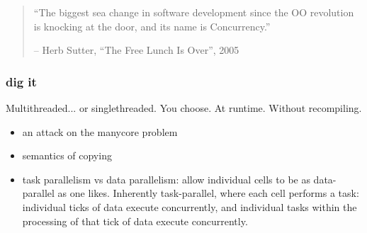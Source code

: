 \begin{frame}
\begin{quotation}
``The biggest sea change in software development since the OO
revolution is knocking at the door, and its name is Concurrency.''

\vskip0.5cm
-- Herb Sutter, ``The Free Lunch Is Over'', 2005
\end{quotation}
\end{frame}

\begin{frame}[fragile]
\frametitle{dig it}


Multithreaded... or singlethreaded.  You choose.  At runtime.  Without
recompiling.
\begin{itemize}[<+-| alert@+>]

\item an attack on the manycore problem

\item semantics of copying

\item task parallelism vs data parallelism: allow individual cells to be
as data-parallel as one likes.  Inherently task-parallel, where each
cell performs a task: individual ticks of data execute concurrently,
and individual tasks within the processing of that tick of data
execute concurrently.
\end{itemize}

\end{frame}



